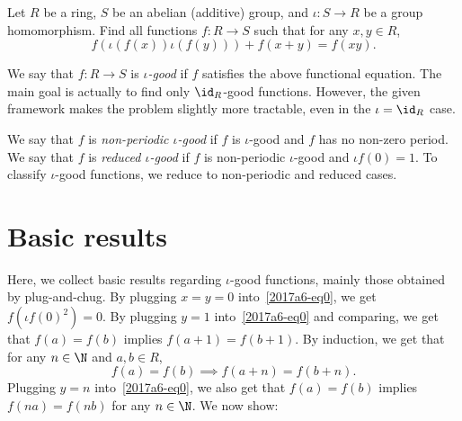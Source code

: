 Let $R$ be a ring, $S$ be an abelian (additive) group, and $\iota : S \to R$ be a group homomorphism.
Find all functions $f : R \to S$ such that for any $x, y \in R$,
\[ f(\iota(f(x)) \iota(f(y))) + f(x + y) = f(xy). \tag{*}\label{2017a6-eq0} \]

We say that $f : R \to S$ is \emph{$\iota$-good} if $f$ satisfies the above functional equation.
The main goal is actually to find only $\id_R$-good functions.
However, the given framework makes the problem slightly more tractable, even in the $\iota = \id_R$ case.

We say that $f$ is \emph{non-periodic $\iota$-good} if $f$ is $\iota$-good and $f$ has no non-zero period.
We say that $f$ is \emph{reduced $\iota$-good} if $f$ is non-periodic $\iota$-good and $\iota f(0) = 1$.
To classify $\iota$-good functions, we reduce to non-periodic and reduced cases.





\section{Basic results}

Here, we collect basic results regarding $\iota$-good functions, mainly those obtained by plug-and-chug.
By plugging $x = y = 0$ into~\eqref{2017a6-eq0}, we get $f(\iota f(0)^2) = 0$.
By plugging $y = 1$ into~\eqref{2017a6-eq0} and comparing, we get that $f(a) = f(b)$ implies $f(a + 1) = f(b + 1)$.
By induction, we get that for any $n \in \N$ and $a, b \in R$,
\[ f(a) = f(b) \implies f(a + n) = f(b + n). \]
Plugging $y = n$ into~\eqref{2017a6-eq0}, we also get that $f(a) = f(b)$ implies $f(na) = f(nb)$ for any $n \in \N$.
We now show:

